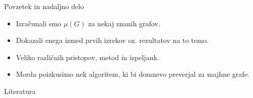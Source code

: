 \documentclass{beamer}
\begin{document}
\begin{frame}{Povzetek in nadaljno delo}
	\begin{itemize}
		\item Izračunali smo $\mu(G)$ za nekaj znanih grafov. \pause
		\item Dokazali enega izmed prvih izrekov oz. rezultatov na to temo. \pause
		\item Veliko različnih pristopov, metod in izpeljank. \pause
		\item Morda poizkusimo nek algoritem, ki bi domnevo preverjal za majhne grafe.
		
	\end{itemize}
\nocite{*}
\end{frame}

\begin{frame}{Literatura}
	  
	 
\end{frame}
\end{document}
